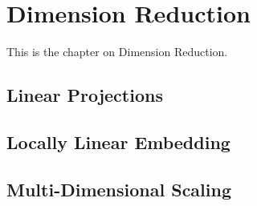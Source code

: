 \documentclass[MachineLearning]{subfiles}
\begin{document}

\section{Dimension Reduction}
This is the chapter on Dimension Reduction.
\subsection{Linear Projections}
\subsection{Locally Linear Embedding}
\subsection{Multi-Dimensional Scaling}
\end{document}
